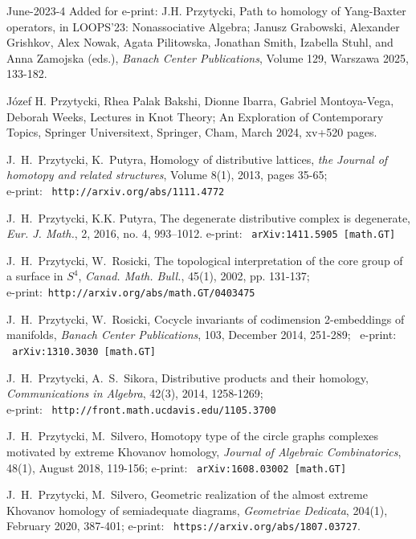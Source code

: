 \documentclass[12pt]{amsart}
\begin{document}
\begin{thebibliography}{June-2023-4}
 {\color{red} Added for e-print:} J.H. Przytycki, Path to homology of Yang-Baxter operators, in LOOPS'23: Nonassociative Algebra; Janusz Grabowski, Alexander Grishkov, Alex Nowak, Agata Pilitowska, Jonathan Smith, Izabella Stuhl, and Anna Zamojska (eds.),  {\it Banach Center Publications},
Volume 129, Warszawa 2025, 133-182.

 J\'ozef H. Przytycki, Rhea Palak Bakshi, Dionne Ibarra, Gabriel Montoya-Vega,  Deborah Weeks,
Lectures in Knot Theory; An Exploration of Contemporary Topics,
Springer Universitext, Springer, Cham, March 2024, xv+520 pages.

J.~H.~Przytycki, K.~Putyra, Homology of distributive lattices,
{\it the Journal of homotopy and related structures}, Volume 8(1), 2013, pages 35-65;\\
e-print: \ {\tt http://arxiv.org/abs/1111.4772}

 J.~H.~Przytycki, K.K. Putyra, 
 The degenerate distributive complex is degenerate,
{\it Eur. J. Math.}, 2, 2016, no. 4, 993–1012.
e-print: \ {\tt   arXiv:1411.5905 [math.GT]}


J.~H.~Przytycki, W.~Rosicki,
The topological interpretation of the core group of a surface in $S^4$,
{\it Canad. Math. Bull.}, 45(1), 2002, pp. 131-137;\\
e-print:\ {\tt  http://arxiv.org/abs/math.GT/0403475}

J.~H.~Przytycki, W.~Rosicki,
Cocycle invariants of  codimension 2-embeddings of manifolds,
{\it Banach Center Publications}, 103, December 2014, 251-289; \
e-print: \ {\tt   arXiv:1310.3030 [math.GT]}

J.~H.~Przytycki, A.~S.~Sikora,
Distributive products and their homology, {\it Communications in Algebra},
42(3), 2014, 1258-1269;\\
e-print: \ {\tt   http://front.math.ucdavis.edu/1105.3700}

 J.~H.~Przytycki, M.~Silvero, 
Homotopy type of the circle graphs complexes motivated by extreme Khovanov homology,
{\it Journal of Algebraic Combinatorics}, 48(1), August 2018, 119-156;
e-print: \ {\tt arXiv:1608.03002 [math.GT]}

 J.~H.~Przytycki, M.~Silvero,
 Geometric realization of the almost  extreme Khovanov homology of semiadequate diagrams, 
{\it Geometriae Dedicata}, 204(1), February 2020, 387-401;
 e-print: \ {\tt   https://arxiv.org/abs/1807.03727}.


\end{thebibliography}
\end{document}
